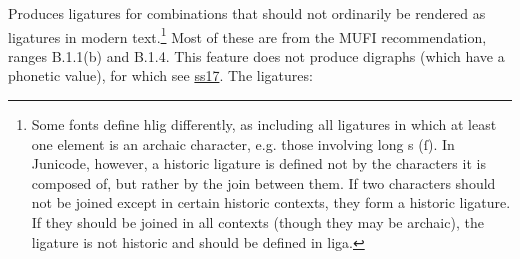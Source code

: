 \documentclass[letterpaper,12pt]{article}
\begin{document}
Produces ligatures for combinations that should not ordinarily be rendered as
ligatures in modern text.\footnote{Some
fonts define hlig differently, as including all ligatures in which at least one
element is an archaic character, e.g.
those involving long s (\textrm{ſ\hspace{0.2em}}). In Junicode, however, a
historic ligature is defined not by the characters it is composed of, but
rather by the join between them. If two characters should not be joined except
in certain historic contexts, they form a historic ligature. If they should be
joined in all contexts (though they may be archaic), the ligature is not historic
and should be defined in liga.} Most of these are from the MUFI recommendation,
ranges B.1.1(b) and B.1.4. This feature does
not produce digraphs (which have a phonetic value), for which see
\hyperlink{ss17}{ss17}. The ligatures:
\end{document}
